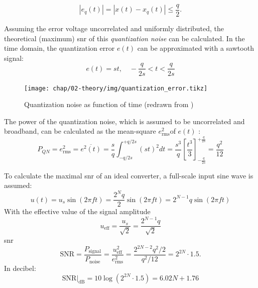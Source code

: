 \begin{equation}
\left| e_q(t) \right| = \left| x(t) - x_q(t) \right| \leq \frac{q}{2}.
\end{equation}
 \cite{puente2015} 

Assuming the error voltage uncorrelated and uniformly distributed, the theoretical (maximum) \gls{snr} of this \textit{quantization noise} can be calculated. In the time domain, the quantization error $e(t)$ can be approximated with a sawtooth signal:
\begin{equation}
e(t) = st, \quad -\frac{q}{2s} < t < \frac{q}{2s} 
\end{equation}
\begin{figure}[tbh]
	\centering
	\texttt{[image: chap/02-theory/img/quantization\_error.tikz]}
	\caption{Quantization noise as function of time (redrawn from \cite{walt})}
	\label{fig:eq}
\end{figure}

The power of the quantization noise, which is assumed to be uncorrelated and broadband, can be calculated as the mean-square $e_{\text{rms}}^2$of $e(t)$ \cite{walt}:
\begin{equation}
P_{QN} = e_{\text{rms}}^{2} = \overline{e^{2}(t)} = \frac{s}{q}\int_{-q/2s}^{+q/2s} (st)^{2} dt = \frac{s^3}{q} \left[ \frac{t^3}{3}\right]_{-\frac{q}{2s}}^{+\frac{q}{2s}} = \frac{q^2}{12}
\end{equation}

To calculate the maximal \gls{snr} of an ideal converter, a full-scale input sine wave is assumed:
\begin{equation}
u(t) = u_s \sin(2\pi f t) = \frac{2^{N}q}{2}\sin(2\pi f t)  = 2^{N-1}q \sin(2\pi f t)
\end{equation}
With the effective value of the signal amplitude
\begin{equation}
u_{\text{eff}} = \frac{u_s}{\sqrt{2}} = \frac{2^{N-1}q}{\sqrt{2}}
\end{equation}
\gls{snr}
\begin{equation}
\text{SNR} = \frac{P_{\text{signal}}}{P_{\text{noise}}} = \frac{u_{\text{eff}}^{2}}{e_{\text{rms}}^{2}} = \frac{2^{2N-2}q^2/2}{q^2/12} = 2^{2N} \cdot 1.5.
\end{equation}
In decibel:
\begin{equation}\label{eq:idealSNR}
\text{SNR}|_{\text{dB}} = 10\log\left(2^{2N}\cdot 1.5\right) = 6.02 N + 1.76
\end{equation}
\cite{puente2015} \cite{walt}



